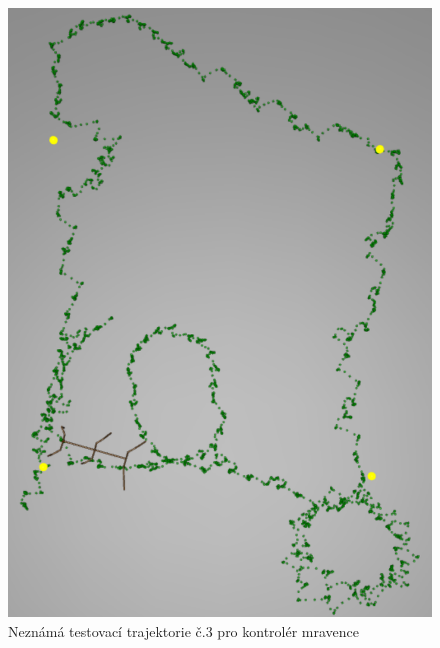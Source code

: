 \begin{figure}[h]
\begin{minipage}[c]{0.48\linewidth}
    \end{minipage}
    \hfill
    \begin{minipage}[c]{0.48\linewidth}
        \includegraphics[width=\linewidth]{obrazky/mravenec_testovaci_trajektorie3.png}
        \caption{Neznámá testovací trajektorie č.3 pro kontrolér mravence}
        \label{fig:mravenec_testovaci_trajektorie3}
    \end{minipage}
\end{figure}


\clearpage














